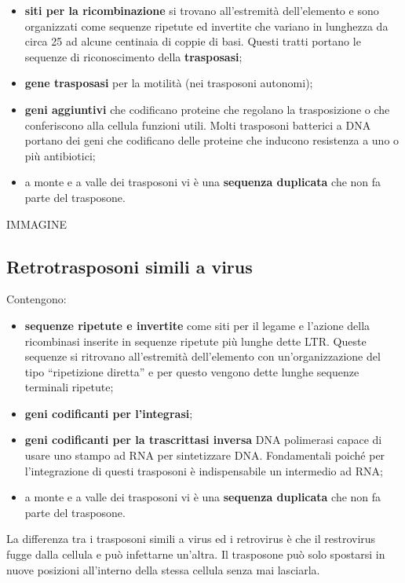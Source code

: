 \documentclass[]{article}
\begin{document}
\begin{itemize}
\itemsep1pt\parskip0pt
\item
  \textbf{siti per la ricombinazione} si trovano all'estremità
  dell'elemento e sono organizzati come sequenze ripetute ed invertite
  che variano in lunghezza da circa 25 ad alcune centinaia di coppie di
  basi. Questi tratti portano le sequenze di riconoscimento della
  \textbf{trasposasi};
\item
  \textbf{gene trasposasi} per la motilità (nei trasposoni autonomi);
\item
  \textbf{geni aggiuntivi} che codificano proteine che regolano la
  trasposizione o che conferiscono alla cellula funzioni utili. Molti
  trasposoni batterici a DNA portano dei geni che codificano delle
  proteine che inducono resistenza a uno o più antibiotici;
\item
  a monte e a valle dei trasposoni vi è una \textbf{sequenza duplicata}
  che non fa parte del trasposone.
\end{itemize}

IMMAGINE

\subsection{Retrotrasposoni simili a
virus}\label{retrotrasposoni-simili-a-virus}

Contengono:

\begin{itemize}
\itemsep1pt\parskip0pt
\item
  \textbf{sequenze ripetute e invertite} come siti per il legame e
  l'azione della ricombinasi inserite in sequenze ripetute più lunghe
  dette LTR. Queste sequenze si ritrovano all'estremità dell'elemento
  con un'organizzazione del tipo ``ripetizione diretta'' e per questo
  vengono dette lunghe sequenze terminali ripetute;
\item
  \textbf{geni codificanti per l'integrasi};
\item
  \textbf{geni codificanti per la trascrittasi inversa} DNA polimerasi
  capace di usare uno stampo ad RNA per sintetizzare DNA. Fondamentali
  poiché per l'integrazione di questi trasposoni è indispensabile un
  intermedio ad RNA;
\item
  a monte e a valle dei trasposoni vi è una \textbf{sequenza duplicata}
  che non fa parte del trasposone.
\end{itemize}

La differenza tra i trasposoni simili a virus ed i retrovirus è che il
restrovirus fugge dalla cellula e può infettarne un'altra. Il trasposone
può solo spostarsi in nuove posizioni all'interno della stessa cellula
senza mai lasciarla.
\end{document}
